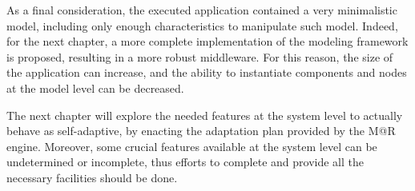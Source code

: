 As a final consideration, the executed application contained a very minimalistic model, including only enough characteristics to manipulate such model.
Indeed, for the next chapter, a more complete implementation of the modeling framework is proposed, resulting in a more robust middleware.
For this reason, the size of the application can increase, and the ability to instantiate components and nodes at the model level can be decreased.

The next chapter will explore the needed features at the system level to actually behave as self-adaptive, by enacting the adaptation plan provided by the M@R engine.
Moreover, some crucial features available at the system level can be undetermined or incomplete, thus efforts to complete and provide all the necessary facilities should be done. 

